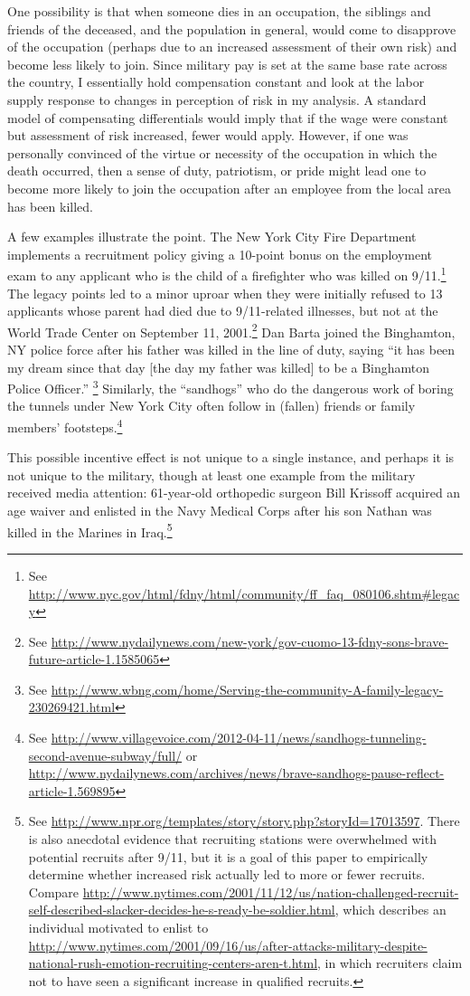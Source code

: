 \documentclass[12pt] {article}
\begin{document}
One possibility is that when someone dies in an occupation, the siblings and friends of the deceased, and the population in general, would come to disapprove of the occupation (perhaps due to an increased assessment of their own risk) and become less likely to join. Since military pay is set at the same base rate across the country, I essentially hold compensation constant and look at the labor supply response to changes in perception of risk in my analysis. A standard model of compensating differentials would imply that if the wage were constant but assessment of risk increased, fewer would apply. However, if one was personally convinced of the virtue or necessity of the occupation in which the death occurred, then a sense of duty, patriotism, or pride might lead one to become more likely to join the occupation after an employee from the local area has been killed.  

A few examples illustrate the point.  The New York City Fire Department implements a recruitment policy giving a  10-point bonus on the employment exam to any applicant who is the child of a firefighter who was killed on 9/11.\footnote {See \url{http://www.nyc.gov/html/fdny/html/community/ff_faq_080106.shtm\#legacy}} The legacy points led to a minor uproar when they were initially refused to 13 applicants whose parent had died due to 9/11-related illnesses, but not at the World Trade Center on September 11, 2001.\footnote{See \url{http://www.nydailynews.com/new-york/gov-cuomo-13-fdny-sons-brave-future-article-1.1585065}} Dan Barta joined the Binghamton, NY police force after his father was killed in the line of duty, saying ``it has been my dream since that day [the day my father was killed] to be a Binghamton Police Officer.'' 
\footnote{See \url{http://www.wbng.com/home/Serving-the-community-A-family-legacy-230269421.html}} Similarly, the ``sandhogs'' who do the dangerous work of boring the tunnels under New York City often follow in (fallen) friends or family members' footsteps.\footnote{See \url{http://www.villagevoice.com/2012-04-11/news/sandhogs-tunneling-second-avenue-subway/full/} or \url{http://www.nydailynews.com/archives/news/brave-sandhogs-pause-reflect-article-1.569895}} 

This possible incentive effect is not unique to a single instance, and perhaps it is not unique to the military, though at least one example from the military received media attention: 61-year-old orthopedic surgeon Bill Krissoff acquired an age waiver and enlisted in the Navy Medical Corps after his son Nathan was killed in the Marines in Iraq.\footnote{See \url{http://www.npr.org/templates/story/story.php?storyId=17013597}.  There is also anecdotal evidence that recruiting stations were overwhelmed with potential recruits
after 9/11, but it is a goal of this paper to empirically determine whether increased risk actually led to more or fewer recruits. Compare \url{http://www.nytimes.com/2001/11/12/us/nation-challenged-recruit-self-described-slacker-decides-he-s-ready-be-soldier.html},
which describes an individual motivated to enlist to \url{http://www.nytimes.com/2001/09/16/us/after-attacks-military-despite-national-rush-emotion-recruiting-centers-aren-t.html}, in which recruiters claim not to have seen a significant increase
in qualified recruits.}%
\end{document}
